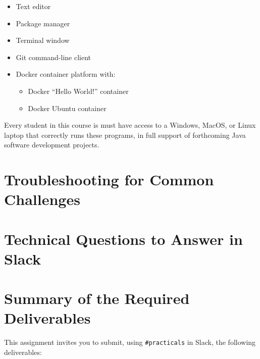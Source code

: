 \documentclass[11pt]{article}
\newcommand{\url}[1]{\lstinline{#1}}
\begin{document}
\begin{itemize}
  \setlength{\itemsep}{0pt}

  \item Text editor

  \item Package manager

  \item Terminal window

  \item Git command-line client

  \item Docker container platform with:

    \vspace*{-.1in}
    \begin{itemize}
      \setlength{\itemsep}{0pt}

      \item Docker ``Hello World!'' container
      \item Docker Ubuntu container

    \end{itemize}

\end{itemize}

\vspace*{-.1in}

Every student in this course is must have access to a Windows, MacOS, or Linux
laptop that correctly runs these programs, in full support of forthcoming Java
software development projects.

\section*{Troubleshooting for Common Challenges}

\section*{Technical Questions to Answer in Slack}

\section*{Summary of the Required Deliverables}


\noindent This assignment invites you to submit, using \url{#practicals} in
Slack, the following deliverables:
\end{document}
